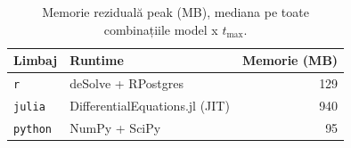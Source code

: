 \begin{table}[!htbp]
\centering
\caption[Memorie peak (mediană)]{Memorie reziduală peak (MB), mediana pe toate combinațiile model x $t_{\max}$.}
\label{tab:bench_memory}
\footnotesize
\setlength{\tabcolsep}{4pt}
\begin{tabularx}{\columnwidth}{l X r}
\toprule
\textbf{Limbaj} & \textbf{Runtime} & \textbf{Memorie (MB)} \\
\midrule
\texttt{r} & deSolve + RPostgres & 129 \\
\texttt{julia} & DifferentialEquations.jl (JIT) & 940 \\
\texttt{python} & NumPy + SciPy & 95 \\
\bottomrule
\end{tabularx}
\end{table}
